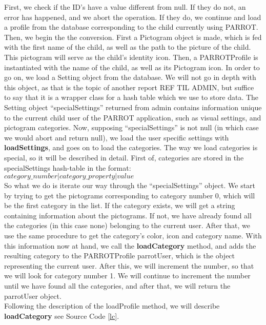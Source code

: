 First, we check if the ID's have a value different from null. If they do not, an error has happened, and we abort the operation.
If they do, we continue and load a profile from the database corresponding to the child currently using PARROT.\newline
Then, we begin the the conversion.
First a Pictogram object is made, which is fed with the first name of the child, as well as the path to the picture of the child.
This pictogram will serve as the child's identity icon.
Then, a PARROTProfile is instantiated with the name of the child, as well as its Pictogram icon.\newline
In order to go on, we load a Setting object from the database. We will not go in depth with this object, as that is the topic of another report REF TIL ADMIN, but suffice to say that it is a wrapper class for a hash table %
which we use to store data.\newline
The Setting object ``specialSettings'' returned from admin contains information unique to the current child user of the PARROT application, such as visual settings, and pictogram categories.
Now, supposing ``specialSettings'' is not null (in which case we would abort and return null), we load the user specific settings with \textbf{loadSettings}, and goes on to load the categories.\newline
The way we load categories is special, so it will be described in detail.
First of, categories are stored in the specialSettings hash-table in the format: \newline 
\\
$category\_number | category\_property | value$ \newline
\\
So what we do is iterate our way through the ``specialSettings'' object.
We start by trying to get the pictograms corresponding to category number 0, which will be the first category in the list.
If the category exists, we will get a string containing information about the pictograms.
If not, we have already found all the categories (in this case none) belonging to the current user.\newline
After that, we use the same procedure to get the category's color, icon and category name.
With this information now at hand, we call the \textbf{loadCategory} method, and adds the resulting category to the PARROTProfile parrotUser, which is the object representing the current user.\newline
After this, we will increment the number, so that we will look for category number 1.
We will continue to increment the number until we have found all the categories, and after that, we will return the parrotUser object.\newline
\\
Following the description of the loadProfile method, we will describe \textbf{loadCategory} see Source Code \ref{lc}.

